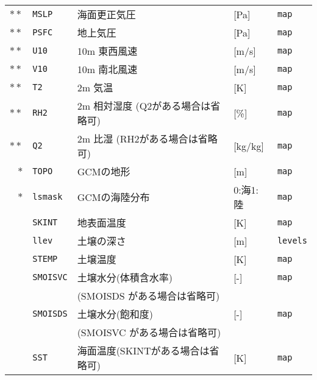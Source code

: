 {\begin{table}[!h]
\begin{center}
\begin{tabularx}{150mm}{rl|l|l|X}
$\ast\ast$ &\verb|MSLP|    & 海面更正気圧                      & [Pa]     & \verb|map| \\
$\ast\ast$ &\verb|PSFC|    & 地上気圧                          & [Pa]     & \verb|map| \\
$\ast\ast$ &\verb|U10|     & 10m 東西風速                      & [m/s]    & \verb|map| \\
$\ast\ast$ &\verb|V10|     & 10m 南北風速                      & [m/s]    & \verb|map| \\
$\ast\ast$ &\verb|T2|      & 2m 気温                           & [K]      & \verb|map| \\
$\ast\ast$ &\verb|RH2|     & 2m 相対湿度 (Q2がある場合は省略可) & [\%]    & \verb|map| \\
$\ast\ast$ &\verb|Q2|      & 2m 比湿 (RH2がある場合は省略可)    & [kg/kg] & \verb|map| \\
    $\ast$ &\verb|TOPO|    & GCMの地形                         & [m]      & \verb|map| \\
    $\ast$ &\verb|lsmask|  & GCMの海陸分布                     & 0:海1:陸 & \verb|map| \\
           &\verb|SKINT|   & 地表面温度                        & [K]      & \verb|map| \\
           &\verb|llev|    & 土壌の深さ                        & [m]      & \verb|levels| \\
           &\verb|STEMP|   & 土壌温度                          & [K]      & \verb|map| \\
           &\verb|SMOISVC| & 土壌水分(体積含水率)              & [-]      & \verb|map| \\
           &               & (SMOISDS がある場合は省略可)      &          &            \\
           &\verb|SMOISDS| & 土壌水分(飽和度)                  & [-]      & \verb|map| \\
           &               & (SMOISVC がある場合は省略可)      &          &            \\
           &\verb|SST|     & 海面温度(SKINTがある場合は省略可) & [K]      & \verb|map| \\ \hline
\end{tabularx}
\end{center}
\end{table}
}
